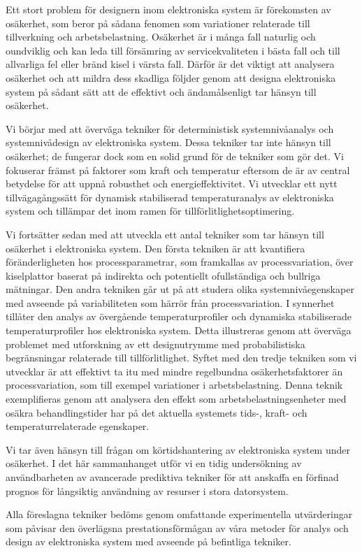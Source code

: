 Ett stort problem för designern inom elektroniska system är förekomsten av
osäkerhet, som beror på sådana fenomen som variationer relaterade till
tillverkning och arbetsbelastning. Osäkerhet är i många fall naturlig och
oundviklig och kan leda till försämring av servicekvaliteten i bästa fall och
till allvarliga fel eller bränd kisel i värsta fall. Därför är det viktigt att
analysera osäkerhet och att mildra dess skadliga följder genom att designa
elektroniska system på sådant sätt att de effektivt och ändamålsenligt tar
hänsyn till osäkerhet.

Vi börjar med att överväga tekniker för deterministisk systemnivåanalys och
systemnivådesign av elektroniska system. Dessa tekniker tar inte hänsyn till
osäkerhet; de fungerar dock som en solid grund för de tekniker som gör det. Vi
fokuserar främst på faktorer som kraft och temperatur eftersom de är av central
betydelse för att uppnå robusthet och energieffektivitet. Vi utvecklar ett nytt
tillvägagångssätt för dynamisk stabiliserad temperaturanalys av elektroniska
system och tillämpar det inom ramen för tillförlitlighetsoptimering.

Vi fortsätter sedan med att utveckla ett antal tekniker som tar hänsyn till
osäkerhet i elektroniska system. Den första tekniken är att kvantifiera
föränderligheten hos processparametrar, som framkallas av processvariation, över
kiselplattor baserat på indirekta och potentiellt ofullständiga och bullriga
mätningar. Den andra tekniken går ut på att studera olika systemnivåegenskaper
med avseende på variabiliteten som härrör från processvariation. I synnerhet
tillåter den analys av övergående temperaturprofiler och dynamiska stabiliserade
temperaturprofiler hos elektroniska system. Detta illustreras genom att överväga
problemet med utforskning av ett designutrymme med probabilistiska begränsningar
relaterade till tillförlitlighet. Syftet med den tredje tekniken som vi
utvecklar är att effektivt ta itu med mindre regelbundna osäkerhetsfaktorer än
processvariation, som till exempel variationer i arbetsbelastning. Denna teknik
exemplifieras genom att analysera den effekt som arbetsbelastningsenheter med
osäkra behandlingstider har på det aktuella systemets tids-, kraft- och
temperaturrelaterade egenskaper.

Vi tar även hänsyn till frågan om körtidshantering av elektroniska system under
osäkerhet. I det här sammanhanget utför vi en tidig undersökning av
användbarheten av avancerade prediktiva tekniker för att anskaffa en förfinad
prognos för långsiktig användning av resurser i stora datorsystem.

Alla föreslagna tekniker bedöms genom omfattande experimentella utvärderingar
som påvisar den överlägsna prestationsförmågan av våra metoder för analys och
design av elektroniska system med avseende på befintliga tekniker.


